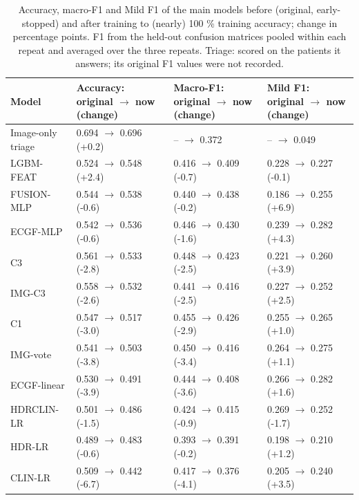 \begin{table}[htbp]
\caption{Accuracy, macro-F1 and Mild F1 of the main models before (original, early-stopped) and after training to (nearly) 100 \% training accuracy; change in percentage points. F1 from the held-out confusion matrices pooled within each repeat and averaged over the three repeats. Triage: scored on the patients it answers; its original F1 values were not recorded.}\label{tab:7.4}
\footnotesize
\begin{tabular}{>{\raggedright\arraybackslash\hspace{0pt}}p{}>{\raggedright\arraybackslash\hspace{0pt}}p{}>{\raggedright\arraybackslash\hspace{0pt}}p{}>{\raggedright\arraybackslash\hspace{0pt}}p{}}
\toprule
\textbf{Model} & \textbf{Accuracy: original $\rightarrow$ now (change)} & \textbf{Macro-F1: original $\rightarrow$ now (change)} & \textbf{Mild F1: original $\rightarrow$ now (change)} \\
\midrule
Image-only triage & 0.694 $\rightarrow$ 0.696 (+0.2) & -- $\rightarrow$ 0.372 & -- $\rightarrow$ 0.049 \\
LGBM-FEAT & 0.524 $\rightarrow$ 0.548 (+2.4) & 0.416 $\rightarrow$ 0.409 (-0.7) & 0.228 $\rightarrow$ 0.227 (-0.1) \\
FUSION-MLP & 0.544 $\rightarrow$ 0.538 (-0.6) & 0.440 $\rightarrow$ 0.438 (-0.2) & 0.186 $\rightarrow$ 0.255 (+6.9) \\
ECGF-MLP & 0.542 $\rightarrow$ 0.536 (-0.6) & 0.446 $\rightarrow$ 0.430 (-1.6) & 0.239 $\rightarrow$ 0.282 (+4.3) \\
C3 & 0.561 $\rightarrow$ 0.533 (-2.8) & 0.448 $\rightarrow$ 0.423 (-2.5) & 0.221 $\rightarrow$ 0.260 (+3.9) \\
IMG-C3 & 0.558 $\rightarrow$ 0.532 (-2.6) & 0.441 $\rightarrow$ 0.416 (-2.5) & 0.227 $\rightarrow$ 0.252 (+2.5) \\
C1 & 0.547 $\rightarrow$ 0.517 (-3.0) & 0.455 $\rightarrow$ 0.426 (-2.9) & 0.255 $\rightarrow$ 0.265 (+1.0) \\
IMG-vote & 0.541 $\rightarrow$ 0.503 (-3.8) & 0.450 $\rightarrow$ 0.416 (-3.4) & 0.264 $\rightarrow$ 0.275 (+1.1) \\
ECGF-linear & 0.530 $\rightarrow$ 0.491 (-3.9) & 0.444 $\rightarrow$ 0.408 (-3.6) & 0.266 $\rightarrow$ 0.282 (+1.6) \\
HDRCLIN-LR & 0.501 $\rightarrow$ 0.486 (-1.5) & 0.424 $\rightarrow$ 0.415 (-0.9) & 0.269 $\rightarrow$ 0.252 (-1.7) \\
HDR-LR & 0.489 $\rightarrow$ 0.483 (-0.6) & 0.393 $\rightarrow$ 0.391 (-0.2) & 0.198 $\rightarrow$ 0.210 (+1.2) \\
CLIN-LR & 0.509 $\rightarrow$ 0.442 (-6.7) & 0.417 $\rightarrow$ 0.376 (-4.1) & 0.205 $\rightarrow$ 0.240 (+3.5) \\
\bottomrule
\end{tabular}
\end{table}
